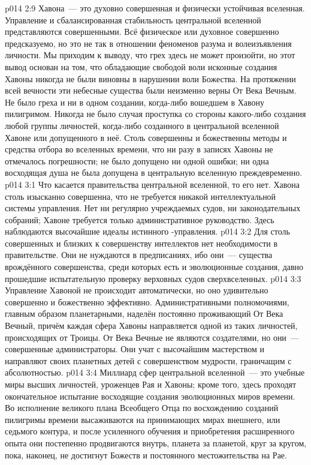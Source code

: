 \vs p014 2:9 \pc Хавона~--- это духовно совершенная и физически устойчивая вселенная. Управление и сбалансированная стабильность центральной вселенной представляются совершенными. Всё физическое или духовное совершенно предсказуемо, но это не так в отношении феноменов разума и волеизъявления личности. Мы приходим к выводу, что грех здесь не может произойти, но этот вывод основан на том, что обладающие свободой воли исконные создания Хавоны никогда не были виновны в нарушении воли Божества. На протяжении всей вечности эти небесные существа были неизменно верны От Века Вечным. Не было греха и ни в одном создании, когда\hyp{}либо вошедшем в Хавону пилигримом. Никогда не было случая проступка со стороны какого\hyp{}либо создания любой группы личностей, когда\hyp{}либо созданного в центральной вселенной Хавоне или допущенного в неё. Столь совершенны и божественны методы и средства отбора во вселенных времени, что ни разу в записях Хавоны не отмечалось погрешности; не было допущено ни одной ошибки; ни одна восходящая душа не была допущена в центральную вселенную преждевременно.
\vs p014 3:1 Что касается правительства центральной вселенной, то его нет. Хавона столь изысканно совершенна, что не требуется никакой интеллектуальной системы управления. Нет ни регулярно учреждаемых судов, ни законодательных собраний; Хавоне требуется только административное руководство. Здесь наблюдаются высочайшие идеалы истинного \hyp{}управления.
\vs p014 3:2 Для столь совершенных и близких к совершенству интеллектов нет необходимости в правительстве. Они не нуждаются в предписаниях, ибо они~--- существа врождённого совершенства, среди которых есть и эволюционные создания, давно прошедшие испытательную проверку верховных судов сверхвселенных.
\vs p014 3:3 Управление Хавоной не происходит автоматически, но оно удивительно совершенно и божественно эффективно. Административными полномочиями, главным образом планетарными, наделён постоянно проживающий От Века Вечный, причём каждая сфера Хавоны направляется одной из таких личностей, происходящих от Троицы. От Века Вечные не являются создателями, но они~--- совершенные администраторы. Они учат с высочайшим мастерством и направляют своих планетных детей с совершенством мудрости, граничащим с абсолютностью.
\vs p014 3:4 Миллиард сфер центральной вселенной~--- это учебные миры высших личностей, уроженцев Рая и Хавоны; кроме того, здесь проходят окончательное испытание восходящие создания эволюционных миров времени. Во исполнение великого плана Всеобщего Отца по восхождению созданий пилигримы времени высаживаются на принимающих мирах внешнего, или седьмого контура, и после усиленного обучения и приобретения расширенного опыта они постепенно продвигаются внутрь, планета за планетой, круг за кругом, пока, наконец, не достигнут Божеств и постоянного местожительства на Рае.
